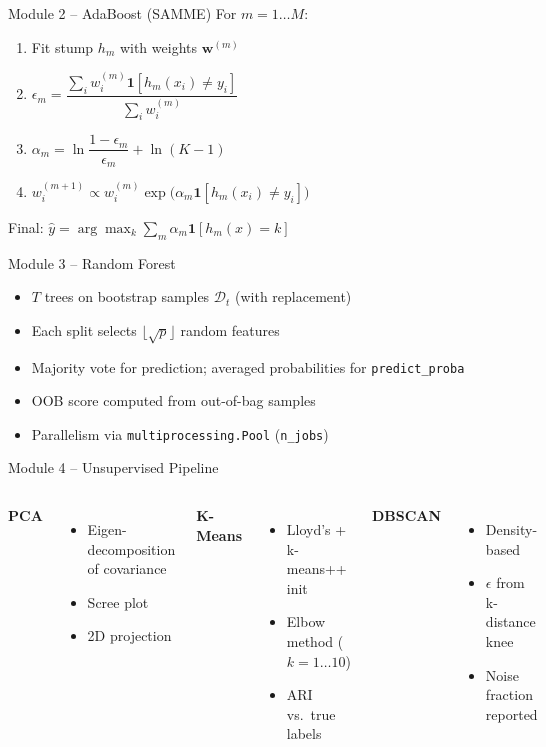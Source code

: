 \documentclass[aspectratio=169,12pt]{beamer}
\begin{document}
\begin{frame}{Module 2 -- AdaBoost (SAMME)}
For $m = 1 \ldots M$:
\begin{enumerate}
  \item Fit stump $h_m$ with weights $\mathbf{w}^{(m)}$
  \item $\epsilon_m = \dfrac{\sum_i w_i^{(m)} \mathbf{1}[h_m(x_i)\neq y_i]}{\sum_i w_i^{(m)}}$
  \item $\alpha_m = \ln\dfrac{1-\epsilon_m}{\epsilon_m} + \ln(K-1)$
  \item $w_i^{(m+1)} \propto w_i^{(m)} \exp\!\bigl(\alpha_m \mathbf{1}[h_m(x_i)\neq y_i]\bigr)$
\end{enumerate}
\vfill
Final: $\hat{y} = \arg\max_k \sum_m \alpha_m \mathbf{1}[h_m(x)=k]$
\end{frame}

\begin{frame}{Module 3 -- Random Forest}
\begin{itemize}
  \item $T$ trees on bootstrap samples $\mathcal{D}_t$ (with replacement)
  \item Each split selects $\lfloor\sqrt{p}\rfloor$ random features
  \item Majority vote for prediction; averaged probabilities for \texttt{predict\_proba}
  \item OOB score computed from out-of-bag samples
  \item Parallelism via \texttt{multiprocessing.Pool} (\texttt{n\_jobs})
\end{itemize}
\end{frame}

\begin{frame}{Module 4 -- Unsupervised Pipeline}
\begin{columns}
\textbf{PCA}
\begin{itemize}\small
  \item Eigen-decomposition of covariance
  \item Scree plot
  \item 2D projection
\end{itemize}
\textbf{K-Means}
\begin{itemize}\small
  \item Lloyd's + k-means++ init
  \item Elbow method ($k=1\ldots10$)
  \item ARI vs.\ true labels
\end{itemize}
\textbf{DBSCAN}
\begin{itemize}\small
  \item Density-based
  \item $\epsilon$ from k-distance knee
  \item Noise fraction reported
\end{itemize}
\end{columns}
\end{frame}
\end{document}
